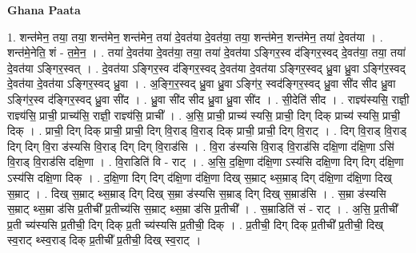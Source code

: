 \documentclass[17pt]{extarticle}
\begin{document}
\textbf{Ghana Paata } \newline

1. शन्त॑मेन॒ तया॒ तया॒ शन्त॑मेन॒ शन्त॑मेन॒ तया॑ दे॒वत॑या दे॒वत॑या॒ तया॒ शन्त॑मेन॒ शन्त॑मेन॒ तया॑ दे॒वत॑या । . शन्त॑मे॒नेति॒ शं - त॒मे॒न॒ । . तया॑ दे॒वत॑या दे॒वत॑या॒ तया॒ तया॑ दे॒वत॑या ऽङ्गिर॒स्व द॑ङ्गिर॒स्वद् दे॒वत॑या॒ तया॒ तया॑ दे॒वत॑या ऽङ्गिर॒स्वत् । . दे॒वत॑या ऽङ्गिर॒स्व द॑ङ्गिर॒स्वद् दे॒वत॑या दे॒वत॑या ऽङ्गिर॒स्वद् ध्रु॒वा ध्रु॒वा ऽङ्गि॑र॒स्वद् दे॒वत॑या दे॒वत॑या ऽङ्गिर॒स्वद् ध्रु॒वा । . अ॒ङ्गि॒र॒स्वद् ध्रु॒वा ध्रु॒वा ऽङ्गि॑र॒ स्वद॑ङ्गिर॒स्वद् ध्रु॒वा सी॑द सीद ध्रु॒वा ऽङ्गि॑र॒स्व द॑ङ्गिर॒स्वद् ध्रु॒वा सी॑द । . ध्रु॒वा सी॑द सीद ध्रु॒वा ध्रु॒वा सी॑द । . सी॒देति॑ सीद । . राज्ञ्य॑स्यसि॒ राज्ञी॒ राज्ञ्य॑सि॒ प्राची॒ प्राच्य॑सि॒ राज्ञी॒ राज्ञ्य॑सि॒ प्राची᳚ । . अ॒सि॒ प्राची॒ प्राच्य॑ स्यसि॒ प्राची॒ दिग् दिक् प्राच्य॑ स्यसि॒ प्राची॒ दिक् । . प्राची॒ दिग् दिक् प्राची॒ प्राची॒ दिग् वि॒राड् वि॒राड् दिक् प्राची॒ प्राची॒ दिग् वि॒राट् । . दिग् वि॒राड् वि॒राड् दिग् दिग् वि॒रा ड॑स्यसि वि॒राड् दिग् दिग् वि॒राड॑सि । . वि॒रा ड॑स्यसि वि॒राड् वि॒राड॑सि दक्षि॒णा द॑क्षि॒णा ऽसि॑ वि॒राड् वि॒राड॑सि दक्षि॒णा । . वि॒राडिति॑ वि - राट् । . अ॒सि॒ द॒क्षि॒णा द॑क्षि॒णा ऽस्य॑सि दक्षि॒णा दिग् दिग् द॑क्षि॒णा ऽस्य॑सि दक्षि॒णा दिक् । . द॒क्षि॒णा दिग् दिग् द॑क्षि॒णा द॑क्षि॒णा दिख् स॒म्राट् थ्स॒म्राड् दिग् द॑क्षि॒णा द॑क्षि॒णा दिख् स॒म्राट् । . दिख् स॒म्राट् थ्स॒म्राड् दिग् दिख् स॒म्रा ड॑स्यसि स॒म्राड् दिग् दिख् स॒म्राड॑सि । . स॒म्रा ड॑स्यसि स॒म्राट् थ्स॒म्रा ड॑सि प्र॒तीची᳚ प्र॒तीच्य॑सि स॒म्राट् थ्स॒म्रा ड॑सि प्र॒तीची᳚ । . स॒म्राडिति॑ सं - राट् । . अ॒सि॒ प्र॒तीची᳚ प्र॒ती च्य॑स्यसि प्र॒तीची॒ दिग् दिक् प्र॒ती च्य॑स्यसि प्र॒तीची॒ दिक् । . प्र॒तीची॒ दिग् दिक् प्र॒तीची᳚ प्र॒तीची॒ दिख् स्व॒राट् थ्स्व॒राड् दिक् प्र॒तीची᳚ प्र॒तीची॒ दिख् स्व॒राट् । \newline
\end{document}

